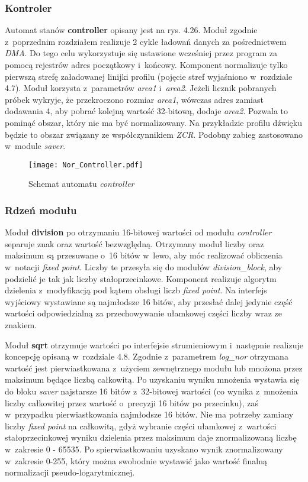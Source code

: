 \subsubsection{Kontroler}
Automat stanów \textbf{controller} opisany jest na rys. 4.26. Moduł zgodnie z~poprzednim rozdziałem realizuje 2 cykle ładowań danych za pośrednictwem \textit{DMA}. Do tego celu wykorzystuje się ustawione wcześniej przez program za pomocą rejestrów adres początkowy i~końcowy. Komponent normalizuje tylko pierwszą strefę załadowanej linijki profilu (pojęcie stref wyjaśniono w~rozdziale 4.7). Moduł korzysta z~parametrów \textit{area1} i~\textit{area2}. Jeżeli licznik pobranych próbek wykryje, że przekroczono rozmiar \textit{area1}, wówczas adres zamiast dodawania 4, aby pobrać kolejną wartość 32-bitową, dodaje \textit{area2}. Pozwala to pominąć obszar, który nie ma być normalizowany. Na przykładzie profilu dźwięku będzie to obszar związany ze współczynnikiem \textit{ZCR}. Podobny zabieg zastosowano w~module \textit{saver}.

\begin{figure}[h]
	\centering
	\texttt{[image: Nor\_Controller.pdf]}
	\caption{Schemat automatu \textit{controller}}
\end{figure}
\FloatBarrier %

\subsubsection{Rdzeń modułu}

Moduł \textbf{division} po otrzymaniu 16-bitowej wartości od modułu \textit{controller} separuje znak oraz wartość bezwzględną. Otrzymany moduł liczby oraz maksimum są przesuwane o~16 bitów w~lewo, aby móc realizować obliczenia w~notacji \textit{fixed point}. Liczby te przesyła się do modułów \textit{division\_block}, aby podzielić je tak jak liczby stałoprzecinkowe. Komponent realizuje algorytm dzielenia \cite{Division} z~modyfikacją pod kątem obsługi liczb \textit{fixed point}. Na interfejs wyjściowy wystawiane są najmłodsze 16 bitów, aby przesłać dalej jedynie część wartości odpowiedzialną za przechowywanie ułamkowej części liczby wraz ze znakiem.

Moduł \textbf{sqrt} otrzymuje wartości po interfejsie strumieniowym i~następnie realizuje koncepcję opisaną w~rozdziale 4.8. Zgodnie z~parametrem \textit{log\_nor} otrzymana wartość jest pierwiastkowana z~użyciem zewnętrznego modułu lub mnożona przez maksimum będące liczbą całkowitą. Po uzyskaniu wyniku mnożenia wystawia się do bloku \textit{saver} najstarsze 16 bitów z~32-bitowej wartości (co wynika z~mnożenia liczby całkowitej przez wartość o~precyzji 16 bitów po przecinku), zaś w~przypadku pierwiastkowania najmłodsze 16 bitów. Nie ma potrzeby zamiany liczby \textit{fixed point} na całkowitą, gdyż wybranie części ułamkowej z~wartości stałoprzecinkowej wyniku dzielenia przez maksimum daje znormalizowaną liczbę w~zakresie 0 - 65535. Po spierwiastkowaniu uzyskano wynik znormalizowany w~zakresie 0-255, który można swobodnie wystawić jako wartość finalną normalizacji pseudo-logarytmicznej.

